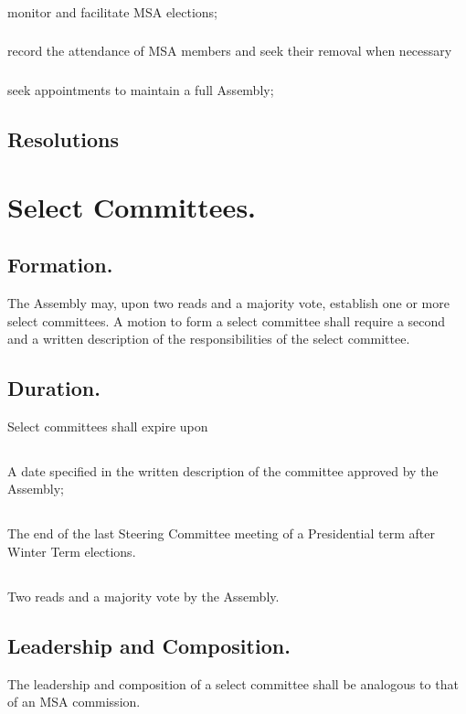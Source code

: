 \documentclass{rules}
\begin{document}
\subsubsection{}
monitor and facilitate MSA elections;
\subsubsection{}
record the attendance of MSA members and seek their removal when necessary
\subsubsection{}
seek appointments to maintain a full Assembly;
\subsection{Resolutions}

\section{Select Committees.}
\subsection{Formation.}
The Assembly may, upon two reads and a majority vote, establish one or more select committees.  A motion to form a select committee shall require a second and a written description of the responsibilities of the select committee.
\subsection{Duration.}
Select committees shall expire upon
\subsection{}
A date specified in the written description of the committee approved by the Assembly;
\subsection{}
The end of the last Steering Committee meeting of a Presidential term after Winter Term elections. 
\subsection{}
Two reads and a majority vote by the Assembly.
\subsection{Leadership and Composition.}
The leadership and composition of a select committee shall be analogous to that of an MSA commission.  
\end{document}
